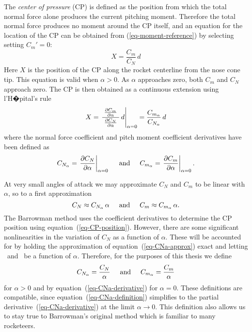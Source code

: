 The {\it center of pressure} (CP) is defined as the position from
which the total normal force alone produces the current pitching
moment.  Therefore the total normal force produces no moment around
the CP itself, and an equation for the location of the CP
can be obtained from (\ref{eq-moment-reference}) by selecting setting
$C_m'=0$:
%
\begin{equation}
X = \frac{C_m}{C_N}\,d
\end{equation}
%
Here $X$ is the position of the CP along the rocket centerline from
the nose cone tip.  This equation is valid when $\alpha>0$.  As
$\alpha$ approaches zero, both $C_m$ and $C_N$ approach zero.  The CP
is then obtained as a continuous extension using l'H�pital's rule
%
\begin{equation}
X = \left.\frac{\;\frac{\partial C_m}{\partial\alpha}\;}
          {\;\frac{\partial C_N}{\partial\alpha}\;}\,d\right|_{\alpha=0}
  = \frac{C_{m_\alpha}}{{C_{N_\alpha}}}\,d
\label{eq-CP-position}
\end{equation}
%
where the normal force coefficient and pitch moment coefficient
derivatives have been defined as
%
\begin{equation}
{C_{N_\alpha}} = \left.\frac{\partial C_N}{\partial\alpha}\right|_{\alpha=0}
\hspace{5mm}\mbox{and}\hspace{5mm}
C_{m_\alpha} = \left.\frac{\partial C_m}{\partial\alpha}\right|_{\alpha=0}.
\label{eq-CNa-derivative}
\end{equation}

At very small angles of attack we may approximate $C_N$ and $C_m$ to
be linear with $\alpha$, so to a first approximation
%
\begin{equation}
C_N \approx {C_{N_\alpha}}\,\alpha
\hspace{5mm}\mbox{and}\hspace{5mm}
C_m \approx C_{m_\alpha}\,\alpha.
\label{eq-CNa-approx}
\end{equation}
%
The Barrowman method uses the coefficient derivatives to determine the
CP position using equation~(\ref{eq-CP-position}).  However, there are
some significant nonlinearities in the variation of $C_N$ as a
function of $\alpha$.  These will be accounted for by holding the
approximation of equation~(\ref{eq-CNa-approx}) exact and letting
\CNa\ and \Cma\ be a function of $\alpha$.  Therefore, for the
purposes of this thesis we define
%
\begin{equation}
{C_{N_\alpha}} = \frac{C_N}{\alpha}
\hspace{5mm}\mbox{and}\hspace{5mm}
C_{m_\alpha} = \frac{C_m}{\alpha}
\label{eq-CNa-definition}
\end{equation}
%
for $\alpha>0$ and by equation~(\ref{eq-CNa-derivative}) for
$\alpha=0$.  These definitions are compatible, since
equation~(\ref{eq-CNa-definition}) simplifies to the partial
derivative~(\ref{eq-CNa-derivative}) at the limit
$\alpha\rightarrow0$.  This definition also allows us to stay true to
Barrowman's original method which is familiar to many rocketeers.


